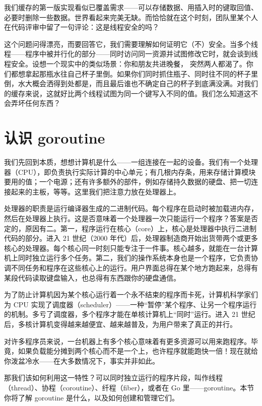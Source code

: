 我们缓存的第一版实现看似已覆盖需求——可以存储数据、用插入时的键取回值、必要时删除一些数据。世界看起来完美无缺。而恰恰就在这个时刻，团队里某个人在代码评审中留了一句评论：这是线程安全的吗？

这个问题问得漂亮，而要回答它，我们需要理解如何证明它（不）安全。当多个线程——程序中被并行化的部分——同时访问同一资源并试图修改它时，就会谈到线程安全。设想一个现实中的类似场景：你和朋友共进晚餐，
突然两人都渴了。你们都想拿起那瓶水往自己杯子里倒。如果你们同时抓住瓶子、同时往不同的杯子里倒，水大概会洒得到处都是，而且最后谁也不确定自己的杯子到底满没满。对我们的缓存来说，这就好比两个线程试图为同一个键写入不同的值。我们怎么知道这不会弄坏任何东西？

\section{认识 goroutine}

我们先回到本质，想想计算机是什么——一组连接在一起的设备。我们有一个处理器（CPU），即负责执行实际计算的中心单元；有几根内存条，用来存储计算模块要用的值；一个电源；还有许多额外的部件，例如存储持久数据的硬盘、把一切连接起来的主板，等等。这里我们把注意力放在处理器上。

处理器的职责是运行编译器生成的二进制代码。每个程序在启动时被加载进内存，然后在处理器上执行。这是否意味着一个处理器一次只能运行一个程序？答案是否定的，原因有二。第一，程序运行在核心（core）上，核心是处理器中执行二进制代码的部分。进入 21 世纪（2000 年代）后，处理器制造商开始出货带两个或更多核心的处理器。每个核心同一时刻只能专注于一件事。核心越多，就能在一台计算机上同时独立运行多个任务。第二，我们的操作系统本身也是一个程序，它负责协调不同任务和程序在这些核心上的运行。用户界面总得在某个地方跑起来，总得有某段代码读取键盘输入，也总得有东西跟你的硬盘通信。

为了防止计算机因为某个核心运行着一个永不结束的程序而卡死，计算机科学家们为 CPU 实现了调度器（scheduler）——一种``暂停''某个程序、让另一个程序运行的机制。多亏了调度器，多个程序才能在单核计算机上``同时''运行。进入 21 世纪后，多核计算机变得越来越便宜、越来越普及，为用户带来了真正的并行。

对许多程序员来说，一台机器上有多个核心意味着有更多资源可以用来跑程序。毕竟，如果负载能分摊到两个核心而不是一个上，也许程序就能跑快一倍！现在就给你泼盆冷水——在大多数情况下，事实并非如此。

那我们该如何利用这一特性？可以同时独立运行的程序片段，叫作线程（thread）、协程（coroutine）、纤程（fiber），或者在 Go 里——goroutine。本节你将了解 goroutine 是什么，以及如何创建和管理它们。

